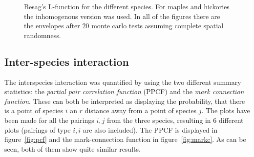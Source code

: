 \documentclass[12pt,a4paper,oneside,article]{memoir}
\begin{document}
\begin{figure}[htb]
\begin{adjustwidth}{-2in}{-2in}
  \end{adjustwidth}
  \caption{Besag's L-function for the different species. For maples and hickories the inhomogenous version was used. In all of the
  figures there are the envelopes after $20$ monte carlo tests assuming complete spatial randomness.}
  \label{fig:intra_interactions}
\end{figure}


\subsection{Inter-species interaction}

The interspecies interaction was quantified by using the two
different summary statistics: the \emph{partial pair correlation function} (PPCF)
and the \emph{mark connection function}. These can both be interpreted
as displaying the probability, that there is a point of species $i$
an $r$ distance away from a point of species $j$. The plots have been made
for all the pairings $i,j$ from the three species, resulting
in $6$ different plots (pairings of type $i,i$ are also included).
The PPCF is displayed in figure~\ref{fig:pcf} and the mark-connection function
in figure~\ref{fig:markc}. As can be seen, both of them show quite similar
results.
\end{document}
